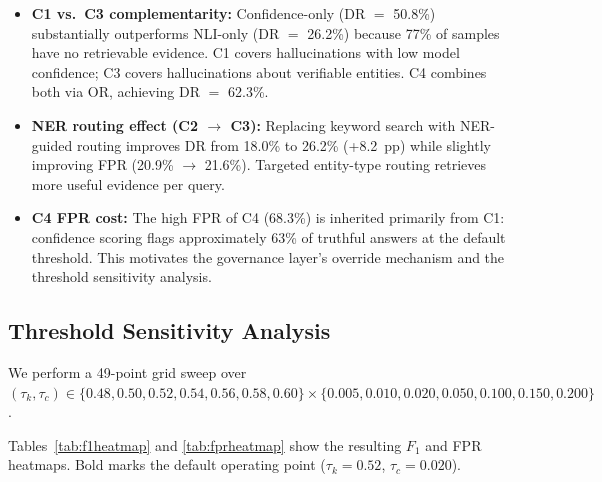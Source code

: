 \documentclass[11pt,a4paper]{article}
\newcommand{\fone}{F_1}
\newcommand{\tauK}{\tau_k}
\newcommand{\tauC}{\tau_c}
\begin{document}
\begin{itemize}
\item \textbf{C1 vs.\ C3 complementarity:} Confidence-only (DR $=$ 50.8\%)
      substantially outperforms NLI-only (DR $=$ 26.2\%) because 77\% of samples
      have no retrievable evidence. C1 covers hallucinations with low model
      confidence; C3 covers hallucinations about verifiable entities. C4 combines
      both via OR, achieving DR $=$ 62.3\%.

\item \textbf{NER routing effect (C2 $\to$ C3):} Replacing keyword search with
      NER-guided routing improves DR from 18.0\% to 26.2\% (+8.2~pp) while
      slightly improving FPR (20.9\% $\to$ 21.6\%). Targeted entity-type routing
      retrieves more useful evidence per query.

\item \textbf{C4 FPR cost:} The high FPR of C4 (68.3\%) is inherited primarily
      from C1: confidence scoring flags approximately 63\% of truthful answers at
      the default threshold. This motivates the governance layer's override
      mechanism and the threshold sensitivity analysis.
\end{itemize}

\subsection{Threshold Sensitivity Analysis}
\label{sec:sensitivity}

We perform a 49-point grid sweep over $(\tauK, \tauC) \in \{0.48, 0.50, 0.52,
0.54, 0.56, 0.58, 0.60\} \times \{0.005, 0.010, 0.020, 0.050, 0.100, 0.150,
0.200\}$.

Tables~\ref{tab:f1heatmap} and \ref{tab:fprheatmap} show the resulting $\fone$
and FPR heatmaps. Bold marks the default operating point
($\tauK = 0.52$, $\tauC = 0.020$).
\end{document}
